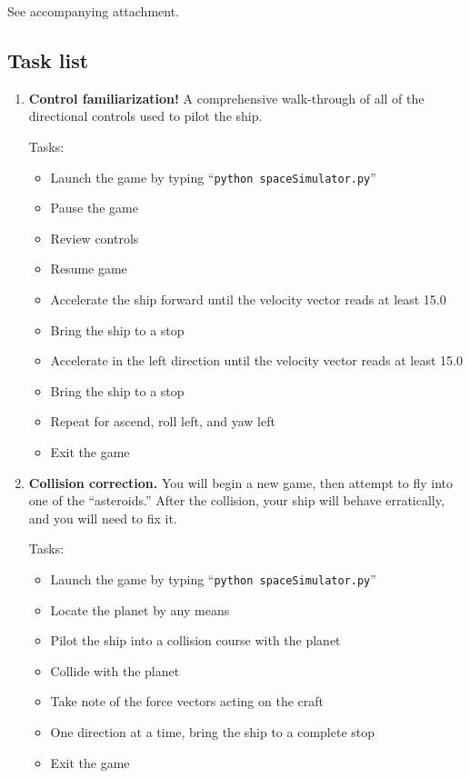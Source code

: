 See accompanying attachment.

\subsection{Task list}

\begin{enumerate}

  \item \textbf{Control familiarization!}  A comprehensive walk-through of all of the directional controls used to pilot the ship. 

  Tasks:
  \begin{itemize}
    \item Launch the game by typing ``\texttt{python spaceSimulator.py}''
    \item Pause the game
    \item Review controls
    \item Resume game
    \item Accelerate the ship forward until the velocity vector reads at least 15.0
    \item Bring the ship to a stop
    \item Accelerate in the left direction until the velocity vector reads at least 15.0
    \item Bring the ship to a stop
    \item Repeat for ascend, roll left, and yaw left
    \item Exit the game
  \end{itemize}
  
  \item \textbf{Collision correction.}  You will begin a new game, then attempt to fly into one of the ``asteroids.''  After the collision, your ship will behave erratically, and you will need to fix it.
  
  Tasks:
  \begin{itemize}
    \item Launch the game by typing ``\texttt{python spaceSimulator.py}''
    \item Locate the planet by any means
    \item Pilot the ship into a collision course with the planet
    \item Collide with the planet
    \item Take note of the force vectors acting on the craft
    \item One direction at a time, bring the ship to a complete stop
    \item Exit the game
  \end{itemize}
  

\end{enumerate}
